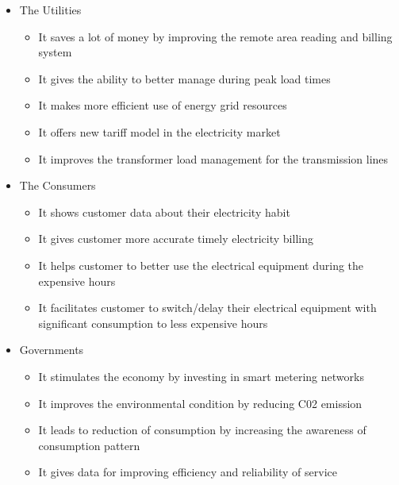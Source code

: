 \begin{itemize}
\item The Utilities
    \begin{itemize}
    \item It saves a lot of money by improving the remote area reading and billing system
    \item It gives the ability to better manage during peak load times
    \item It makes more efficient use of energy grid resources
    \item It offers new tariff model in the electricity market
    \item It improves the transformer load management for the transmission lines
    \end{itemize}
\item The Consumers
    \begin{itemize}
    \item It shows customer data about their electricity habit
    \item It gives customer more accurate timely electricity billing
    \item It helps customer to better use the electrical equipment during the expensive hours
    \item It facilitates customer to switch/delay their electrical equipment with significant consumption to less expensive hours
    \end{itemize}
\item Governments
    \begin{itemize}
    \item It stimulates the economy by investing in smart metering networks
    \item It improves the environmental condition by reducing C02 emission
    \item It leads to reduction of consumption by increasing the awareness of consumption pattern
    \item It gives data for improving efficiency and reliability of service
    \end{itemize}
\end{itemize}


